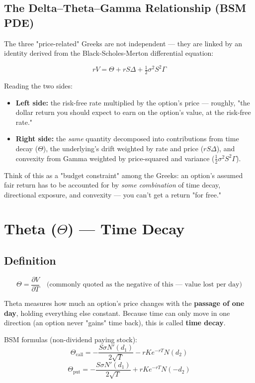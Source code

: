 \documentclass[12pt,openany]{book}
\theoremstyle{definition}
\theoremstyle{remark}
\begin{document}
\subsection{The Delta–Theta–Gamma Relationship (BSM PDE)}

The three "price-related" Greeks are not independent — they are linked by an identity derived from the Black-Scholes-Merton differential equation:

\[
rV = \Theta + rS\Delta + \tfrac{1}{2}\sigma^2 S^2 \Gamma
\]

Reading the two sides:
\begin{itemize}
\item \textbf{Left side:} the risk-free rate multiplied by the option's price — roughly, "the dollar return you should expect to earn on the option's value, at the risk-free rate."
\item \textbf{Right side:} the \emph{same} quantity decomposed into contributions from time decay (\(\Theta\)), the underlying's drift weighted by rate and price (\(rS\Delta\)), and convexity from Gamma weighted by price-squared and variance (\(\tfrac{1}{2}\sigma^2S^2\Gamma\)).
\end{itemize}

Think of this as a "budget constraint" among the Greeks: an option's assumed fair return has to be accounted for by \emph{some combination} of time decay, directional exposure, and convexity — you can't get a return "for free."


\section{Theta (\texorpdfstring{\(\Theta\)}{Theta}) — Time Decay}

\subsection{Definition}

\[
\Theta = \frac{\partial V}{\partial T} \quad \text{(commonly quoted as the negative of this — value lost per day)}
\]

Theta measures how much an option's price changes with the \textbf{passage of one day}, holding everything else constant. Because time can only move in one direction (an option never "gains" time back), this is called \textbf{time decay}.

BSM formulas (non-dividend paying stock):
\[
\Theta_{\text{call}} = -\frac{S\sigma N'(d_1)}{2\sqrt{T}} - rKe^{-rT}N(d_2)
\]
\[
\Theta_{\text{put}} = -\frac{S\sigma N'(d_1)}{2\sqrt{T}} + rKe^{-rT}N(-d_2)
\]
\end{document}
